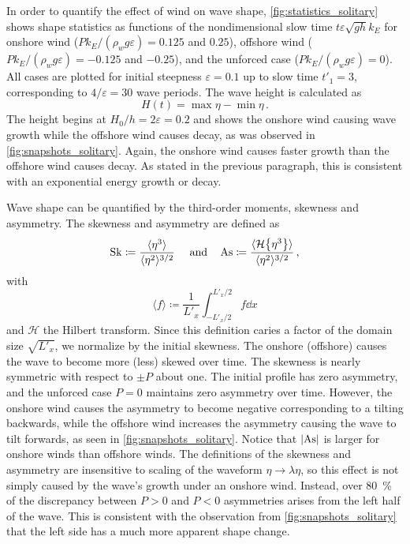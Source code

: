 \documentclass{jfm}
\DeclareMathOperator{\Sk}{Sk}
\DeclareMathOperator{\As}{As}
\newcommand{\hilbert}{\mathcal{H}}
\renewcommand*{\epsilon}{\varepsilon}
\begin{document}
In order to quantify the effect of wind on wave shape,
\cref{fig:statistics_solitary} shows shape statistics as functions of
the nondimensional slow time $t \epsilon \sqrt{g h} k_E$ for onshore
wind ($P k_E/(\rho_w g \epsilon) = 0.125$ and $0.25$), offshore wind ($P
k_E/(\rho_w g \epsilon) = -0.125$ and $-0.25$), and the unforced case
($P k_E/(\rho_w g \epsilon) = 0$).
All cases are plotted for initial steepness $\epsilon = 0.1$ up to slow
time $t'_1 = 3$, corresponding to $4/\epsilon = 30$ wave periods.
The  wave height is calculated as
\begin{equation}
  H(t) = \max{\eta} - \min{\eta} \,.
  \label{eq:height_def}
\end{equation}
The height  begins at $H_0/h = 2
\epsilon = 0.2$ and shows the onshore wind
causing wave growth while the offshore wind causes decay, as was
observed in \cref{fig:snapshots_solitary}.
Again, the onshore wind causes faster growth than the offshore wind
causes decay.
As stated in the previous paragraph, this is consistent with an
exponential energy growth or decay.

Wave shape can be quantified by the third-order moments, skewness and
asymmetry.
The  skewness and
 asymmetry are defined as
\begin{equation}
  \Sk \coloneqq \frac{\langle \eta^3 \rangle}{\langle \eta^2
  \rangle^{3/2}} \
  \qq{and}
  \As \coloneqq \frac{\langle \hilbert \Bqty{\eta^3} \rangle}{\langle
    \eta^2 \rangle^{3/2}} \,,
  \label{eq:shape_stats_def}
\end{equation}
with
\begin{equation}
  \langle f \rangle \coloneqq \frac{1}{L'_x} \int_{-L'_x/2}^{L'_x/2} f
  \dd{x}
\end{equation}
and $\hilbert$ the Hilbert transform.
Since this definition caries a factor of the
domain size $\sqrt{L'_x}$, we normalize by the initial skewness.
The onshore (offshore) causes the wave to become more (less) skewed over
time.
The skewness is nearly symmetric with respect to $\pm P$ about one.
The initial profile has zero asymmetry, and the unforced case
$P=0$ maintains zero asymmetry over time.
However, the onshore wind causes the asymmetry to become negative
corresponding to a tilting backwards, while the offshore wind increases
the asymmetry causing the wave to tilt forwards, as seen in
\cref{fig:snapshots_solitary}.
Notice that $\abs{\As}$ is larger for onshore winds than offshore winds.
The definitions of the skewness and asymmetry are insensitive to scaling
of the waveform $\eta \to \lambda \eta$, so this effect is not simply
caused by the wave's growth under an onshore wind.
Instead, over \SI{80}{\percent} of the discrepancy between $P>0$
and $P<0$ asymmetries arises from the left half of the wave.
This is consistent with the observation from
\cref{fig:snapshots_solitary} that the left side has a much more
apparent shape change.
\end{document}
